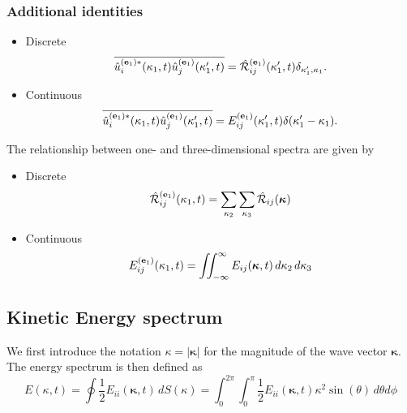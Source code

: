 \documentclass[oneside,a4paper,11pt]{report}
\newcommand{\tpvc}{\mathcal{R}} %
\newcommand{\est}{E}            %
\newcommand{\kappavec}{\boldsymbol{\kappa}}
\begin{document}
\subsubsection{Additional identities}
\begin{itemize}
\item Discrete
\begin{equation} 
\overline{ \hat{u}^{(\evec_1)*}_i(\kappa_1,t) \hat{u}^{(\evec_1)}_j(\kappa'_1,t) } = \hat{\tpvc}^{(\evec_1)}_{ij}(\kappa'_1,t) \delta_{\kappa'_1,\kappa_1}.
\end{equation}
\item Continuous
\begin{equation} 
\overline{ \hat{u}^{(\mathbf{e}_1)*}_i(\kappa_1,t) \hat{u}^{(\mathbf{e}_1)}_j(\kappa'_1,t) } = E^{(\mathbf{e}_1)}_{ij}(\kappa'_1,t)\delta(\kappa'_1 - \kappa_1).
\end{equation}
\end{itemize}

The relationship between one- and three-dimensional spectra are given by
\begin{itemize}
\item Discrete
\begin{equation}
\hat{\tpvc}_{ij}^{(\evec_1)}(\kappa_1,t) = \sum_{\kappa_2} \sum_{\kappa_3} \hat{\tpvc}_{ij} (\kappavec)
\end{equation}
\item Continuous
\begin{equation}
\est_{ij}^{(\evec_1)}(\kappa_1,t) = \iint_{-\infty}^{\infty} \est_{ij}(\kappavec,t) \, d\kappa_2 \, d\kappa_3
\end{equation}
\end{itemize}

\subsection{Kinetic Energy spectrum}

We first introduce the notation $\kappa = |\kappavec|$ for the magnitude of the wave vector $\kappavec$. The energy spectrum is then defined as 
\begin{equation}
\est( \kappa, t ) = \oint \frac{1}{2} \est_{ii}( \kappavec, t ) \, dS(\kappa) = \int_0^{2\pi} \int_0^\pi \frac{1}{2} \est_{ii}(\kappavec, t) \kappa^2 \sin(\theta) \, d\theta d\phi
\end{equation}

\end{document}
